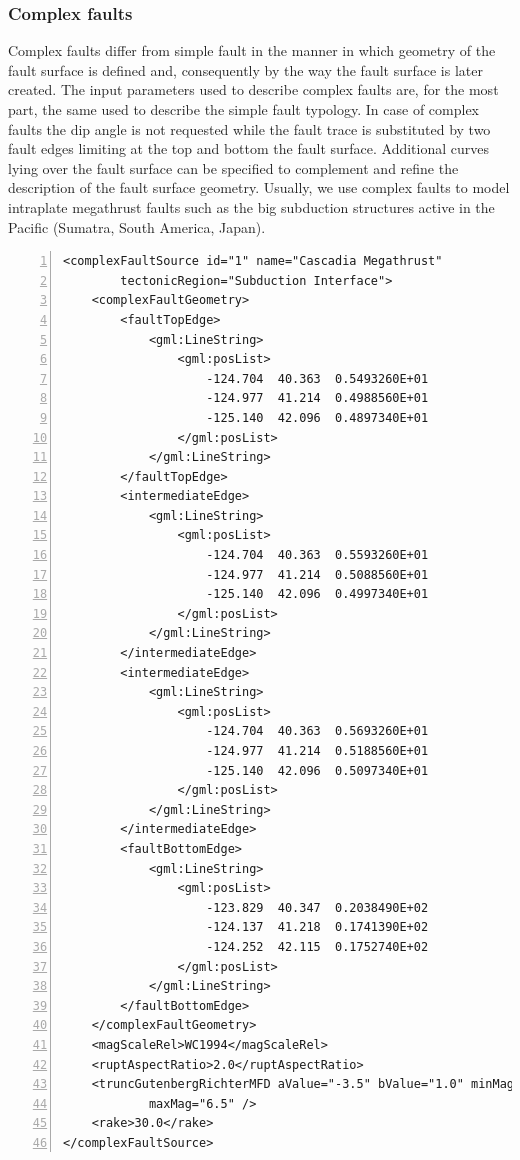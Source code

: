\subsubsection{Complex faults}
%
Complex faults differ from simple fault in the manner in which geometry of 
the fault surface is defined and, consequently by the way the fault 
surface is later created. 
The input parameters used to describe complex faults are, for the most 
part, the same used to describe the simple fault typology. 
In case of complex faults the dip angle is not requested while the fault
trace is substituted by two fault edges limiting at the top and bottom 
the fault surface. Additional curves lying over the fault surface can be 
specified to complement and refine the description of the fault surface 
geometry.
%
Usually, we use complex faults to model intraplate megathrust faults such 
as the big subduction structures active in the Pacific (Sumatra, South 
America, Japan).
\begin{Verbatim}[frame=single, commandchars=\\\{\}, fontsize=\footnotesize,
    numbers=left, numbersep=2pt]
<complexFaultSource id="1" name="Cascadia Megathrust" 
		tectonicRegion="Subduction Interface">
    <complexFaultGeometry>
        <faultTopEdge>
            <gml:LineString>
                <gml:posList>
                    -124.704  40.363  0.5493260E+01
                    -124.977  41.214  0.4988560E+01
                    -125.140  42.096  0.4897340E+01
                </gml:posList>
            </gml:LineString>
        </faultTopEdge>
        <intermediateEdge>
            <gml:LineString>
                <gml:posList>
                    -124.704  40.363  0.5593260E+01
                    -124.977  41.214  0.5088560E+01
                    -125.140  42.096  0.4997340E+01
                </gml:posList>
            </gml:LineString>
        </intermediateEdge>
        <intermediateEdge>
            <gml:LineString>
                <gml:posList>
                    -124.704  40.363  0.5693260E+01
                    -124.977  41.214  0.5188560E+01
                    -125.140  42.096  0.5097340E+01
                </gml:posList>
            </gml:LineString>
        </intermediateEdge>
        <faultBottomEdge>
            <gml:LineString>
                <gml:posList>
                    -123.829  40.347  0.2038490E+02
                    -124.137  41.218  0.1741390E+02
                    -124.252  42.115  0.1752740E+02
                </gml:posList>
            </gml:LineString>
        </faultBottomEdge>
    </complexFaultGeometry>
    <magScaleRel>WC1994</magScaleRel>
    <ruptAspectRatio>2.0</ruptAspectRatio>
    <truncGutenbergRichterMFD aValue="-3.5" bValue="1.0" minMag="5.0" 
			maxMag="6.5" />
    <rake>30.0</rake>
</complexFaultSource>
\end{Verbatim}
%

